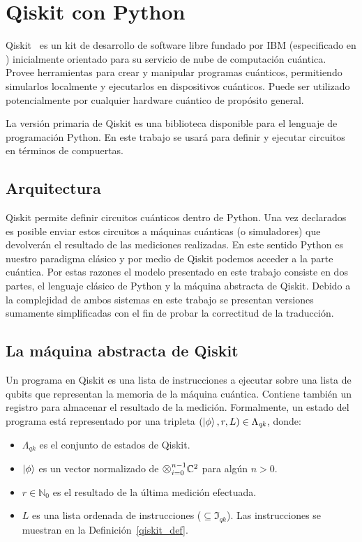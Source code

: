\chapter{Qiskit con Python}\label{ch:python}


Qiskit~\cite{QiskitOfficial, QiskitTextbook} es un kit de desarrollo de software libre fundado por IBM (especificado en \cite{qiskit_spec}) inicialmente orientado para su servicio de nube de computación cuántica. Provee herramientas para crear y manipular programas cuánticos, permitiendo simularlos localmente y ejecutarlos en dispositivos cuánticos. Puede ser utilizado potencialmente por cualquier hardware cuántico de propósito general.

La versión primaria de Qiskit es una biblioteca disponible para el lenguaje de programación Python. En este trabajo se usará para definir y ejecutar circuitos en términos de compuertas.


\section{Arquitectura}
Qiskit permite definir circuitos cuánticos dentro de Python. Una vez declarados es posible enviar estos circuitos a máquinas cuánticas (o simuladores) que devolverán el resultado de las mediciones realizadas. En este sentido Python es nuestro paradigma clásico y por medio de Qiskit podemos acceder a la parte cuántica. Por estas razones el modelo presentado en este trabajo consiste en dos partes, el lenguaje clásico de Python y la máquina abstracta de Qiskit. Debido a la complejidad de ambos sistemas en este trabajo se presentan versiones sumamente simplificadas con el fin de probar la correctitud de la traducción.

\section{La máquina abstracta de Qiskit}

Un programa en Qiskit es una lista de instrucciones a ejecutar sobre una lista de qubits que representan la memoria de la máquina cuántica. Contiene también un registro para almacenar el resultado de la medición. Formalmente, un estado del programa está representado por una tripleta $(\ket{\phi}, r, L) \in \Lambda_\textit{qk}$, donde:
\begin{itemize}
    \item $\Lambda_\textit{qk}$ es el conjunto de estados de Qiskit.
    \item $\ket{\phi}$ es un vector normalizado de $\mathlarger{\mathlarger{\otimes}}_{i=0}^{n-1}\mathbb{C}^2 $ para algún $n > 0$.
    \item $r \in \mathbb{N}_0$ es el resultado de la última medición efectuada.
    \item $L$ es una lista ordenada de instrucciones ($\subseteq \mathfrak{I}_\textit{qk}$). Las instrucciones se muestran en la Definición~\ref{qiskit_def}.
\end{itemize}

